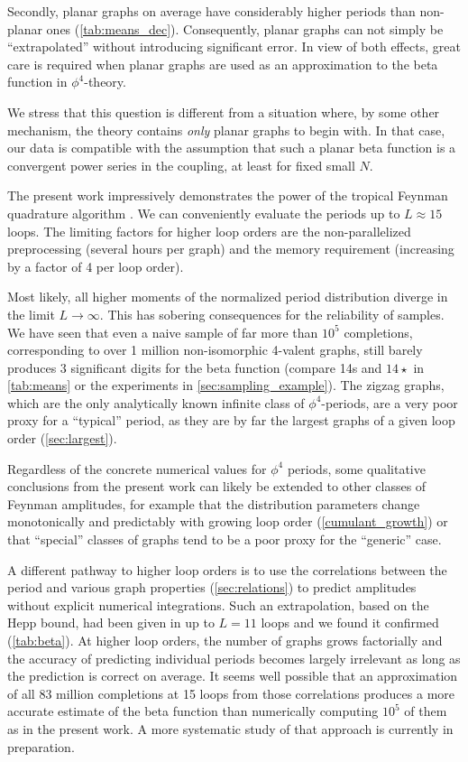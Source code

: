 \documentclass[12pt,a4paper]{article}
\renewcommand{\|}{\rule[-0.4ex]{0.2ex}{1.2em}}
\begin{document}
Secondly, planar graphs on average have considerably higher periods than non-planar ones (\cref{tab:means_dec}). Consequently, planar graphs can not simply be \enquote{extrapolated}  without introducing significant error. In view of both effects, great care is required when planar graphs are used as an approximation to the beta function in $\phi^4$-theory. 

We stress that this question is different from a situation where, by some other mechanism, the theory contains \emph{only} planar graphs to begin with. In that case, our  data is compatible with the assumption that such a planar beta function is a convergent power series in the coupling, at least for fixed small $N$.


The present work impressively demonstrates the power of the tropical Feynman quadrature algorithm \cite{borinsky_tropical_2023a,borinsky_tropical_2023}. We can conveniently evaluate the periods up to   $L\approx 15$ loops. The limiting factors for higher loop orders are the non-parallelized preprocessing (several hours per graph) and the memory requirement (increasing by a factor of 4 per loop order). 


Most likely, all higher moments of the normalized period distribution diverge in the limit $L \rightarrow \infty$. 
This has sobering consequences for the reliability of samples. We have seen that even a naive sample of far more than $10^5$ completions, corresponding to over 1 million non-isomorphic 4-valent graphs, still barely produces 3 significant digits for the beta function (compare 14s and $14\star$ in \cref{tab:means} or the experiments in \cref{sec:sampling_example}). The zigzag graphs, which are the only analytically known infinite class of $\phi^4$-periods, are a very poor proxy for a \enquote{typical} period, as they are by far the largest graphs of a given loop order (\cref{sec:largest}).

Regardless of the concrete numerical values for $\phi^4$ periods, some qualitative conclusions from the present work can likely be extended to other classes of Feynman amplitudes, for example that the distribution parameters change monotonically and predictably with growing loop order (\cref{cumulant_growth}) or that \enquote{special} classes of graphs tend to be a poor proxy for the \enquote{generic} case.

A different pathway to higher loop orders is to use the correlations between the period and various graph properties (\cref{sec:relations}) to predict amplitudes without  explicit numerical integrations. Such an extrapolation, based on the Hepp bound, had been given in \cite{kompaniets_minimally_2017} up to $L=11$ loops  and we found it confirmed (\cref{tab:beta}). At higher loop orders, the number of graphs grows factorially and the accuracy of predicting individual periods becomes largely irrelevant as long as the prediction is correct on average.  It seems well possible that an approximation of all 83 million completions at 15 loops from those correlations produces a more accurate estimate of the beta function than numerically computing $10^5$ of them as in  the present work. A more systematic study of that approach is currently in preparation.
\end{document}
